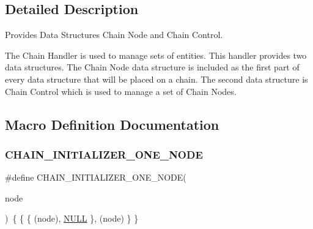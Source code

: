 

\subsection{Detailed Description}
Provides Data Structures Chain Node and Chain Control. 

The Chain Handler is used to manage sets of entities. This handler provides two data structures. The Chain Node data structure is included as the first part of every data structure that will be placed on a chain. The second data structure is Chain Control which is used to manage a set of Chain Nodes. 

\subsection{Macro Definition Documentation}
\mbox{\label{group__RTEMSScoreChain_ga7a5473b2ce45742e83c906284e21bd90}} 
\subsubsection{\texorpdfstring{CHAIN\_INITIALIZER\_ONE\_NODE}{CHAIN\_INITIALIZER\_ONE\_NODE}}
{\footnotesize\ttfamily \#define C\+H\+A\+I\+N\+\_\+\+I\+N\+I\+T\+I\+A\+L\+I\+Z\+E\+R\+\_\+\+O\+N\+E\+\_\+\+N\+O\+DE(\begin{DoxyParamCaption}\item[{}]{node }\end{DoxyParamCaption})~\{ \{ \{ (node), \mbox{\hyperlink{bestcomm__api_8h_a872bb74de61c3689ccd5b41873fce42c}{N\+U\+LL}} \}, (node) \} \}}




